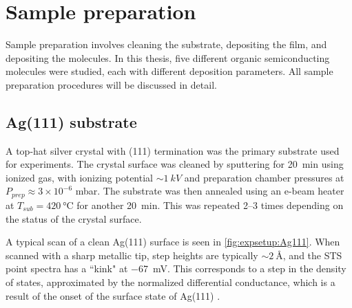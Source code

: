 \section{Sample preparation}

Sample preparation involves cleaning the substrate, depositing the  film, and depositing the molecules. In this thesis, five different organic semiconducting molecules were studied, each with different deposition parameters. All sample preparation procedures will be discussed in detail.

\subsection*{Ag(111) substrate}

A top-hat silver crystal with (111) termination was the primary substrate used for experiments. The crystal surface was cleaned by sputtering for \SI{20}{\minute} using ionized  gas, with ionizing potential $\sim \SI{1}{kV}$ and preparation chamber pressures at $P_{prep} \approx 3 \times 10^{-6}$ mbar. The substrate was then annealed using an e-beam heater at $T_{sub} = \SI{420}{\celsius}$ for another \SI{20}{\minute}. This was repeated 2--3 times depending on the status of the crystal surface.

A typical scan of a clean Ag(111) surface is seen in \autoref{fig:expsetup:Ag111}. When scanned with a sharp metallic tip, step heights are typically $\sim\SI{2}{\angstrom}$, and the \ac{STS} point spectra has a ``kink" at \SI{-67}{mV}. This corresponds to a step in the density of states, approximated by the normalized differential conductance, which is a result of the onset of the surface state of Ag(111) \citep{hovel2001modification}.

